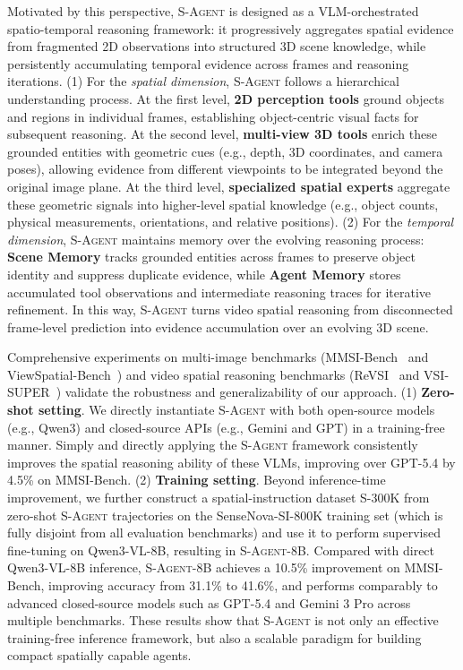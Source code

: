 \documentclass{llmxive}
\begin{document}
Motivated by this perspective, \textsc{S-Agent} is designed as a VLM-orchestrated spatio-temporal reasoning framework: it progressively aggregates spatial evidence from fragmented 2D observations into structured 3D scene knowledge, while persistently accumulating temporal evidence across frames and reasoning iterations. 
% 
(1) For the \textit{spatial dimension}, \textsc{S-Agent} follows a hierarchical understanding process. 
At the first level, \textbf{2D perception tools} ground objects and regions in individual frames, establishing object-centric visual facts for subsequent reasoning. 
At the second level, \textbf{multi-view 3D tools} enrich these grounded entities with geometric cues (e.g., depth, 3D coordinates, and camera poses), allowing evidence from different viewpoints to be integrated beyond the original image plane. 
At the third level, \textbf{specialized spatial experts} aggregate these geometric signals into higher-level spatial knowledge (e.g., object counts, physical measurements, orientations, and relative positions). 
% 
(2) For the \textit{temporal dimension}, \textsc{S-Agent} maintains memory over the evolving reasoning process: \textbf{Scene Memory} tracks grounded entities across frames to preserve object identity and suppress duplicate evidence, while \textbf{Agent Memory} stores accumulated tool observations and intermediate reasoning traces for iterative refinement. 
In this way, \textsc{S-Agent} turns video spatial reasoning from disconnected frame-level prediction into evidence accumulation over an evolving 3D scene.


Comprehensive experiments on multi-image benchmarks (MMSI-Bench~\citep{mmsi_bench} and ViewSpatial-Bench~\citep{viewspatial_bench}) and video spatial reasoning benchmarks (ReVSI~\citep{revsi} and VSI-SUPER~\citep{cambrian_s}) validate the robustness and generalizability of our approach.
% 
(1) \textbf{Zero-shot setting}. We directly instantiate \textsc{S-Agent} with both open-source models (e.g., Qwen3) and closed-source APIs (e.g., Gemini and GPT) in a training-free manner. 
Simply and directly applying the \textsc{S-Agent} framework consistently improves the spatial reasoning ability of these VLMs, improving over GPT-5.4 by 4.5\% on MMSI-Bench. 
% 
(2) \textbf{Training setting}. Beyond inference-time improvement, we further construct a spatial-instruction dataset \textsc{S-300K} from zero-shot \textsc{S-Agent} trajectories on the SenseNova-SI-800K \citep{sensenova_si} training set (which is fully disjoint from all evaluation benchmarks) and use it to perform supervised fine-tuning on Qwen3-VL-8B, resulting in \textsc{S-Agent-8B}. 
% 
Compared with direct Qwen3-VL-8B inference, \textsc{S-Agent-8B} achieves a 10.5\% improvement on MMSI-Bench, improving accuracy from 31.1\% to 41.6\%, and performs comparably to advanced closed-source models such as GPT-5.4 and Gemini 3 Pro across multiple benchmarks. 
% 
These results show that \textsc{S-Agent} is not only an effective training-free inference framework, but also a scalable paradigm for building compact spatially capable agents.
\end{document}
